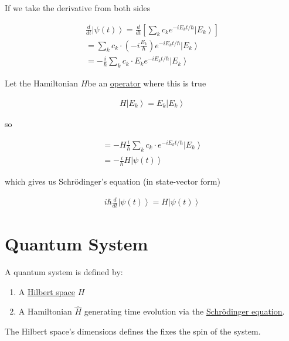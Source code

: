 \documentclass[
]{article}
\providecommand{\tightlist}{%
  \setlength{\itemsep}{0pt}\setlength{\parskip}{0pt}}
\let\oldhyperref\hyperref
\renewcommand{\hyperref}[2][]{\oldhyperref[#1]{\underline{#2}}}
\providecommand{\ket}[1]{\left\lvert #1 \right\rangle}
\begin{document}
If we take the derivative from both sides

\begin{gather*}
	\frac{d}{dt}\ket{\psi(t)}=\frac{d}{dt}\left[\sum_kc_ke^{-iE_kt/\hbar}\ket{E_k}\right]\\
	=\sum_kc_k\cdot \left(-i\frac{E_k}{\hbar}\right)e^{-iE_kt/\hbar}\ket{E_k}\\
	=-\frac{i}{\hbar}\sum_kc_k\cdot E_ke^{-iE_kt/\hbar}\ket{E_k}
\end{gather*}

Let the Hamiltonian \(H\)be an \hyperref[operators]{operator} where this is true

\begin{gather*}
	H\ket{E_k}=E_k\ket{E_k}
\end{gather*}

so

\begin{gather*}
	=-H\frac{i}{\hbar}\sum_kc_k\cdot e^{-iE_kt/\hbar}\ket{E_k}\\
	=-\frac{i}{\hbar}H\ket{\psi(t)}
\end{gather*}

which gives us Schrödinger's equation (in state-vector form)

\begin{gather*}
	i\hbar\frac{d}{dt}\ket{\psi(t)}=H\ket{\psi(t)}
\end{gather*}




\section{Quantum System}\label{quantum-system}
A quantum system is defined by:
\begin{enumerate}
	\def\labelenumi{\arabic{enumi}.}
	\tightlist
	\item A \hyperref[hilbert-spaces]{Hilbert space} \(H\)
	\item A Hamiltonian \(\hat{H}\) generating time evolution via the \hyperref[schruxf6dingers-equation-hamiltonian]{Schrödinger equation}.
\end{enumerate}
The Hilbert space's dimensions defines the fixes the spin of the system.
\end{document}
